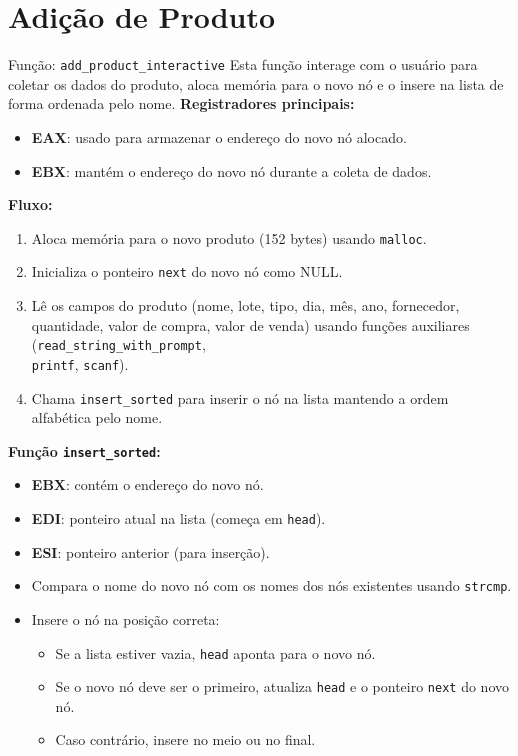 \documentclass[12pt]{article}
\begin{document}
\section{Adição de Produto}
Função: \texttt{add\_product\_interactive}
Esta função interage com o usuário para coletar os dados do produto, aloca memória para o novo nó e o insere na lista de forma ordenada pelo nome.
\textbf{Registradores principais:}
\begin{itemize}
    \item \textbf{EAX}: usado para armazenar o endereço do novo nó alocado.
    \item \textbf{EBX}: mantém o endereço do novo nó durante a coleta de dados.
\end{itemize}
\textbf{Fluxo:}
\begin{enumerate}
    \item Aloca memória para o novo produto (152 bytes) usando \texttt{malloc}.
    \item Inicializa o ponteiro \texttt{next} do novo nó como NULL.
    \item Lê os campos do produto (nome, lote, tipo, dia, mês, ano, fornecedor, quantidade, valor de compra, valor de venda) usando funções auxiliares (\texttt{read\_string\_with\_prompt}, \\ \texttt{printf}, \texttt{scanf}).
    \item Chama \texttt{insert\_sorted} para inserir o nó na lista mantendo a ordem alfabética pelo nome.
\end{enumerate}
\textbf{Função \texttt{insert\_sorted}:}
\begin{itemize}
    \item \textbf{EBX}: contém o endereço do novo nó.
    \item \textbf{EDI}: ponteiro atual na lista (começa em \texttt{head}).
    \item \textbf{ESI}: ponteiro anterior (para inserção).
    \item Compara o nome do novo nó com os nomes dos nós existentes usando \texttt{strcmp}.
    \item Insere o nó na posição correta:
        \begin{itemize}
            \item Se a lista estiver vazia, \texttt{head} aponta para o novo nó.
            \item Se o novo nó deve ser o primeiro, atualiza \texttt{head} e o ponteiro \texttt{next} do novo nó.
            \item Caso contrário, insere no meio ou no final.
        \end{itemize}
\end{itemize}
\end{document}
